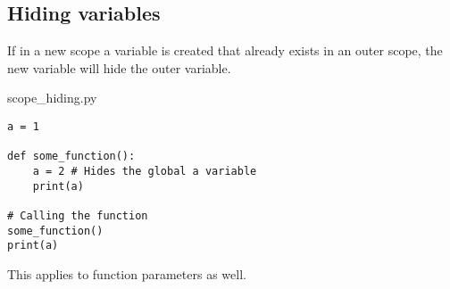 \documentclass[aspectratio=1610,slidestop]{beamer}
\begin{document}
\begin{pframe}
 \addtocounter{framenumber}{-1}
 \begin{center}
  
 \end{center}
\end{pframe}


\subsection{Hiding variables}
\begin{pframe}
 If in a new scope a variable is created that already exists in an outer scope,
 the new variable will hide the outer variable.
 \pause
 \medskip

 \begin{minipage}[t]{0.60\textwidth}
  \begin{pythonfile}{scope\_hiding.py}
   \begin{verbatim}
a = 1

def some_function():
    a = 2 # Hides the global a variable
    print(a)

# Calling the function
some_function()
print(a)
   \end{verbatim}
  \end{pythonfile}
 \end{minipage}\qquad
 \pause
 \begin{minipage}[t]{0.35\textwidth}
 \vspace{-4.55cm}
 \begin{terminal}
  \end{terminal}
 \end{minipage}
 \pause
 \smallskip

  This applies to function parameters as well.
\end{pframe}
\end{document}
